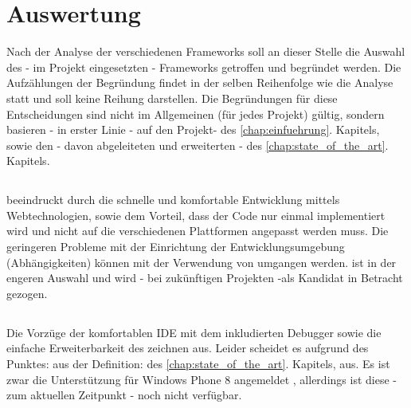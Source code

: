 \documentclass[../Bachelorarbeit.tex]{subfiles}
\begin{document}

\section{Auswertung}
\label{sec:auswertung}

Nach der Analyse der verschiedenen Frameworks soll an dieser Stelle die Auswahl des - im Projekt eingesetzten - Frameworks getroffen und begründet werden. 
Die Aufzählungen der Begründung findet in der selben Reihenfolge wie die Analyse statt und soll keine Reihung darstellen. 
Die Begründungen für diese Entscheidungen sind nicht im Allgemeinen (für jedes Projekt) gültig, sondern basieren - in erster Linie - auf den Projekt- des \ref{chap:einfuehrung}. Kapitels, sowie den - davon abgeleiteten und erweiterten -  des \ref{chap:state_of_the_art}. Kapitels. 

\subsection*{}
 beeindruckt durch die schnelle und komfortable Entwicklung mittels Webtechnologien, sowie dem Vorteil, dass der Code nur einmal implementiert wird und nicht auf die verschiedenen Plattformen angepasst werden muss. Die geringeren Probleme mit der Einrichtung der Entwicklungsumgebung (Abhängigkeiten) können mit der Verwendung von  umgangen werden.
 ist in der engeren Auswahl und wird - bei zukünftigen Projekten -als Kandidat in Betracht gezogen. 

\subsection*{}
Die Vorzüge der komfortablen \ac{IDE} mit dem inkludierten Debugger sowie die einfache Erweiterbarkeit des  zeichnen  aus. 
Leider scheidet es aufgrund des Punktes:  aus der Definition:  des \ref{chap:state_of_the_art}. Kapitels, aus. 
Es ist zwar die Unterstützung für Windows Phone 8 angemeldet \parencite[siehe: ][]{titanium_wp8Support}, allerdings ist diese - zum aktuellen Zeitpunkt - noch nicht verfügbar.
\end{document}
